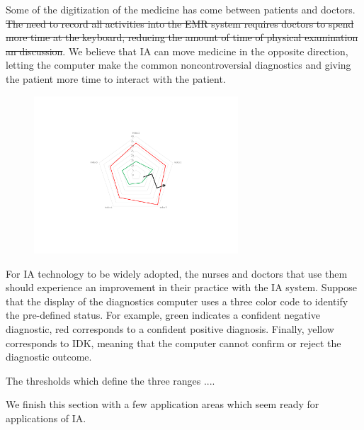 \documentclass[11pt]{pnas-new}
\begin{document}
  Some of the digitization of the medicine has come between patients
  and doctors.  \sout{The need to record all activities into the EMR system requires
  doctors to spend more time at the keyboard, reducing the amount of
  time of physical examination an discussion}.  We believe that IA can
  move medicine in the opposite direction, letting the computer make
  the common noncontroversial diagnostics and giving the patient more
  time to interact with the patient.

\begin{figure}[h]
\begin{center}
\includegraphics[width=3in]{figures/RedYellowGreen2.pdf}
\end{center}
\end{figure}

  For IA technology to be widely adopted, the nurses and doctors that
  use them should experience an improvement in their practice {\color{blue}with the IA system}. Suppose
  that the display of the diagnostics computer uses a three color code
  to identify {\color{blue}the pre-defined status. For example,} green indicates a confident
  negative diagnostic, red corresponds to a confident positive
  diagnosis. Finally, yellow corresponds to IDK, meaning that the
  computer cannot confirm or reject the diagnostic outcome.

  The thresholds which define the three ranges .... 


  
  We finish this section with a few application areas which seem ready
  for applications of IA.
  
\end{document}
